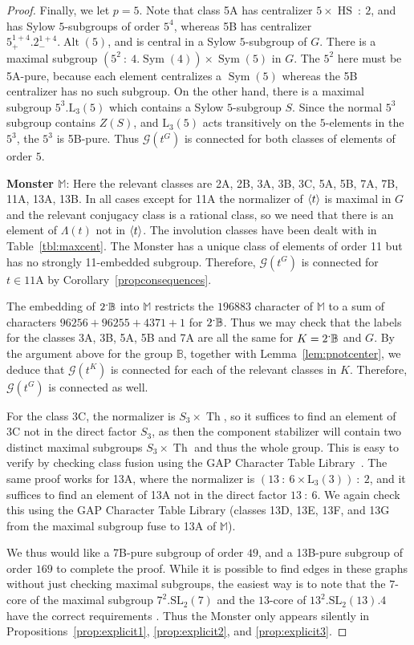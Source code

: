 \documentclass[11pt,a4paper]{amsart}
\theoremstyle{plain}
\theoremstyle{definition}
\theoremstyle{remark}
\theoremstyle{remark}
\theoremstyle{remark}
\theoremstyle{definition}
\def\cn{\mathord{{\!\:{:}\:\!}}}
\newcommand{\ns}{\mathbin{\mspace{-4mu}\vcenter{\hbox{\raisebox{1ex}{$\cdot$}}}\mspace{-4mu}}}
\newcommand{\GG}{\mathcal{G}}
\newcommand{\BM}{\mathbb{B}}
\newcommand{\MM}{\mathbb{M}}
\DeclareMathOperator{\HS}{HS}
\DeclareMathOperator{\Th}{Th}
\DeclareMathOperator{\Alt}{Alt}
\DeclareMathOperator{\Sym}{Sym}
\DeclarePairedDelimiter{\gen}{\langle}{\rangle}
\begin{document}
\begin{proof}
Finally, we let $p=5$. Note that class 5A has centralizer $5 \times \HS\cn2$, and has Sylow $5$-subgroups of order $5^4$, whereas 5B has centralizer $5^{1+4}_+.2^{1+4}_-.\Alt(5)$, and is central in a Sylow $5$-subgroup of $G$. There is a maximal subgroup $(5^2\cn 4.\Sym(4)) \times \Sym(5)$ in $G$. The $5^2$ here must be 5A-pure, because each element centralizes a $\Sym(5)$ whereas the 5B centralizer has no such subgroup. On the other hand, there is a maximal subgroup $5^3.\mathrm{L}_3(5)$ which contains a Sylow $5$-subgroup $S$. Since the normal $5^3$ subgroup contains $Z(S)$, and $\mathrm{L}_3(5)$ acts transitively on the $5$-elements in the $5^3$, the $5^3$ is 5B-pure. Thus $\GG(t^G)$ is connected for both classes of elements of order $5$.

\medskip

\textbf{Monster $\MM$}: Here the relevant classes are 2A, 2B, 3A, 3B, 3C, 5A, 5B, 7A, 7B, 11A, 13A, 13B. In all cases except for 11A the normalizer of $\gen t$ is maximal in $G$ and the relevant conjugacy class is a rational class, so we need that there is an element of $\Lambda(t)$ not in $\gen t$. The involution classes have been dealt with in Table~\ref{tbl:maxcent}. The Monster has a unique class of elements of order 11 but has no strongly 11-embedded subgroup. Therefore, $\GG(t^G)$ is connected for $t\in \mathrm{11A}$ by Corollary~\ref{propconsequences}.

The embedding of $2\ns\BM$ into $\MM$ restricts the $196883$ character of $\MM$ to a sum of characters $96256+96255+4371+1$ for $2\ns\BM$. Thus we may check that the labels for the classes 3A, 3B, 5A, 5B and 7A are all the same for $K=2\ns\BM$ and $G$. By the argument above for the group $\BM$, together with Lemma~\ref{lem:pnotcenter}, we deduce that $\GG(t^K)$ is connected for each of the relevant classes in $K$. Therefore, $\GG(t^G)$ is connected as well.

For the class 3C, the normalizer is $S_3\times\Th$, so it suffices to find an element of 3C not in the direct factor $S_3$, as then the component stabilizer will contain two distinct maximal subgroups $S_3\times\Th$ and thus the whole group. This is easy to verify by checking class fusion using the {\sf GAP} Character Table Library~\cite{CTblLib1.3.11}. The same proof works for 13A, where the normalizer is $(13\cn6 \times \mathrm{L}_3(3))\cn2$, and it suffices to find an element of 13A not in the direct factor $13\cn6$. We again check this using the GAP Character Table Library (classes 13D, 13E, 13F, and 13G from the maximal subgroup fuse to 13A of $\MM$).

We thus would like a 7B-pure subgroup of order $49$, and a 13B-pure subgroup of order $169$ to complete the proof. While it is possible to find edges in these graphs without just checking maximal subgroups, the easiest way is to note that the $7$-core of the maximal subgroup $7^2.\mathrm{SL}_2(7)$ and the $13$-core of $13^2.\mathrm{SL}_2(13).4$ have the correct requirements \cite[Sections 2.20 and 2.24]{dlpp2024un}. Thus the Monster only appears silently in Propositions~\ref{prop:explicit1}, \ref{prop:explicit2}, and \ref{prop:explicit3}.
\end{proof}
\end{document}
